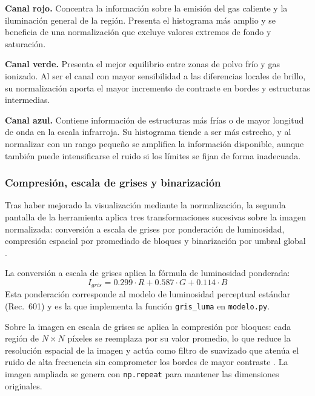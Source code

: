 \documentclass[11pt]{article}
\begin{document}

\textbf{Canal rojo.} Concentra la información sobre la emisión del gas caliente y la iluminación general de la región. Presenta el histograma más amplio y se beneficia de una normalización que excluye valores extremos de fondo y saturación.

\textbf{Canal verde.} Presenta el mejor equilibrio entre zonas de polvo frío y gas ionizado. Al ser el canal con mayor sensibilidad a las diferencias locales de brillo, su normalización aporta el mayor incremento de contraste en bordes y estructuras intermedias.

\textbf{Canal azul.} Contiene información de estructuras más frías o de mayor longitud de onda en la escala infrarroja. Su histograma tiende a ser más estrecho, y al normalizar con un rango pequeño se amplifica la información disponible, aunque también puede intensificarse el ruido si los límites se fijan de forma inadecuada.

\subsubsection{Compresión, escala de grises y binarización}

Tras haber mejorado la visualización mediante la normalización, la segunda pantalla de la herramienta aplica tres transformaciones sucesivas sobre la imagen normalizada: conversión a escala de grises por ponderación de luminosidad, compresión espacial por promediado de bloques y binarización por umbral global \cite{jain}.

La conversión a escala de grises aplica la fórmula de luminosidad ponderada:
\begin{equation}
    I_{gris} = 0.299 \cdot R + 0.587 \cdot G + 0.114 \cdot B
    \label{eq:grises}
\end{equation}
Esta ponderación corresponde al modelo de luminosidad perceptual estándar (Rec.~601) \cite{gonzalez} y es la que implementa la función \texttt{gris\_luma} en \texttt{modelo.py}.

Sobre la imagen en escala de grises se aplica la compresión por bloques: cada región de $N \times N$ píxeles se reemplaza por su valor promedio, lo que reduce la resolución espacial de la imagen y actúa como filtro de suavizado que atenúa el ruido de alta frecuencia sin comprometer los bordes de mayor contraste \cite{szeliski}. La imagen ampliada se genera con \texttt{np.repeat} para mantener las dimensiones originales.
\end{document}

